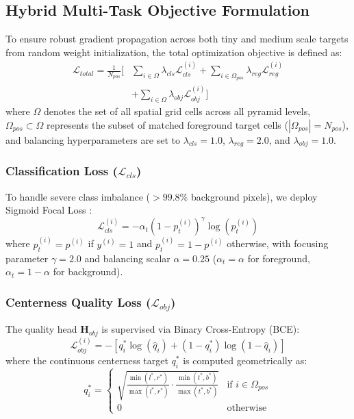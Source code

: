 \documentclass[conference]{IEEEtran}
\begin{document}
\subsection{Hybrid Multi-Task Objective Formulation}
To ensure robust gradient propagation across both tiny and medium scale targets from random weight initialization, the total optimization objective is defined as:
\begin{equation}
\begin{aligned}
\mathcal{L}_{total} = \frac{1}{N_{pos}} \Big[ & \sum_{i \in \Omega} \lambda_{cls} \mathcal{L}_{cls}^{(i)} + \sum_{i \in \Omega_{pos}} \lambda_{reg} \mathcal{L}_{reg}^{(i)} \\
& + \sum_{i \in \Omega} \lambda_{obj} \mathcal{L}_{obj}^{(i)} \Big]
\end{aligned}
\label{eq:total_loss}
\end{equation}
where $\Omega$ denotes the set of all spatial grid cells across all pyramid levels, $\Omega_{pos} \subset \Omega$ represents the subset of matched foreground target cells ($|\Omega_{pos}| = N_{pos}$), and balancing hyperparameters are set to $\lambda_{cls} = 1.0$, $\lambda_{reg} = 2.0$, and $\lambda_{obj} = 1.0$.

\subsubsection{Classification Loss ($\mathcal{L}_{cls}$)}
To handle severe class imbalance ($>99.8\%$ background pixels), we deploy Sigmoid Focal Loss \cite{lin2017focal}:
\begin{equation}
\mathcal{L}_{cls}^{(i)} = - \alpha_t (1 - p_t^{(i)})^\gamma \log(p_t^{(i)})
\end{equation}
where $p_t^{(i)} = p^{(i)}$ if $y^{(i)} = 1$ and $p_t^{(i)} = 1 - p^{(i)}$ otherwise, with focusing parameter $\gamma = 2.0$ and balancing scalar $\alpha = 0.25$ ($\alpha_t = \alpha$ for foreground, $\alpha_t = 1 - \alpha$ for background).

\subsubsection{Centerness Quality Loss ($\mathcal{L}_{obj}$)}
The quality head $\mathbf{H}_{obj}$ is supervised via Binary Cross-Entropy (BCE):
\begin{equation}
\mathcal{L}_{obj}^{(i)} = - \left[ q_i^* \log(\hat{q}_i) + (1 - q_i^*) \log(1 - \hat{q}_i) \right]
\end{equation}
where the continuous centerness target $q_i^*$ is computed geometrically as:
\begin{equation}
q_i^* = \begin{cases}
\sqrt{\frac{\min(l^*, r^*)}{\max(l^*, r^*)} \cdot \frac{\min(t^*, b^*)}{\max(t^*, b^*)}} & \text{if } i \in \Omega_{pos} \\
0 & \text{otherwise}
\end{cases}
\end{equation}
\end{document}
